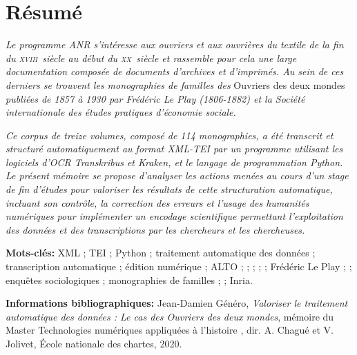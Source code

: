 \section*{Résumé}

\bigbreak

\textit{Le programme ANR \timeus{} s’intéresse aux ouvriers et aux ouvrières du textile de la fin du \textsc{xviii}\ieme ~siècle au début du \textsc{xx}\ieme ~siècle et rassemble pour cela une large documentation composée de documents d'archives et d'imprimés. Au sein de ces derniers se trouvent les monographies de familles des} Ouvriers des deux mondes \textit{publiées de 1857 à 1930 par Frédéric Le Play (1806-1882) et la Société internationale des études pratiques d’économie sociale.}

\textit{Ce corpus de treize volumes, composé de 114 monographies, a été transcrit et structuré automatiquement au format XML-TEI par un programme utilisant les logiciels d’OCR Transkribus et Kraken, et le langage de programmation Python. Le présent mémoire se propose d'analyser les actions menées au cours d'un stage de fin d'études pour valoriser les résultats de cette structuration automatique, incluant son contrôle, la correction des erreurs et l’usage des humanités numériques pour implémenter un encodage scientifique permettant l’exploitation des données et des transcriptions par les chercheurs et les chercheuses.}

\bigbreak

\bigbreak

\bigbreak

\textbf{Mots-clés:} XML ; TEI ; Python ; traitement automatique des données ; transcription automatique ; édition numérique ; ALTO ; \ocr ; \kraken{} ; \transkribus{} ; \gitlab{} ; Frédéric Le Play ; \lodm{} ; enquêtes sociologiques ; monographies de familles ; \timeus{} ; Inria.

\bigbreak

\bigbreak

\bigbreak

\textbf{Informations bibliographiques:} Jean-Damien Généro, \textit{Valoriser le traitement automatique des données : Le cas des Ouvriers des deux mondes}, mémoire du Master \og Technologies numériques appliquées à l'histoire \fg{}, dir. A. Chagué et V. Jolivet, École nationale des chartes, 2020.